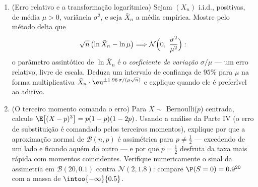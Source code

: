 \begin{problem}
\begin{enumerate}[resume]
  \item (Erro relativo e a transformação logarítmica) Sejam $(X_n)$
        i.i.d., positivas, de média $\mu > 0$, variância $\sigma^2$, e seja $\bar X_n$
        a média empírica. Mostre pelo método delta que
        \[
        \sqrt n\,\bigl(\ln\bar X_n - \ln\mu\bigr)
        \Longrightarrow
        \mathcal N\Bigl(0,\ \frac{\sigma^2}{\mu^2}\Bigr) :
        \]
        o parâmetro assintótico de $\ln\bar X_n$ é o \emph{coeficiente de
        variação} $\sigma/\mu$ --- um erro relativo, livre de escala. Deduza um
        intervalo de confiança de $95\%$ para $\mu$ na forma
        multiplicativa $\bar X_n\cdot\eu^{\pm1.96\,\sigma/(\mu\sqrt
        n)}$ e explique quando ele é preferível ao
        aditivo.
  \item (O terceiro momento comanda o erro) Para $X \sim$
        Bernoulli($p$) centrada, calcule $\E\bigl[(X -
        p)^3\bigr] = p(1-p)(1-2p)$. Usando a análise da
        Parte IV (o erro de substituição é comandado pelos terceiros
        momentos), explique por que a aproximação normal de $\mathcal B(n, p)$ é
        assimétrica para $p \neq \frac12$ --- excedendo de um lado e ficando aquém
        do outro --- e por que $p = \frac12$ desfruta da taxa mais rápida com
        momentos coincidentes. Verifique numericamente o sinal da
        assimetria em $\mathcal
        B(20, 0.1)$ contra $\mathcal N(2, 1.8)$: compare $\P(S = 0) = 0.9^{20}$ com a massa
         de $\intoo{-\infty}{0.5}$.
\end{enumerate}
\end{problem}
